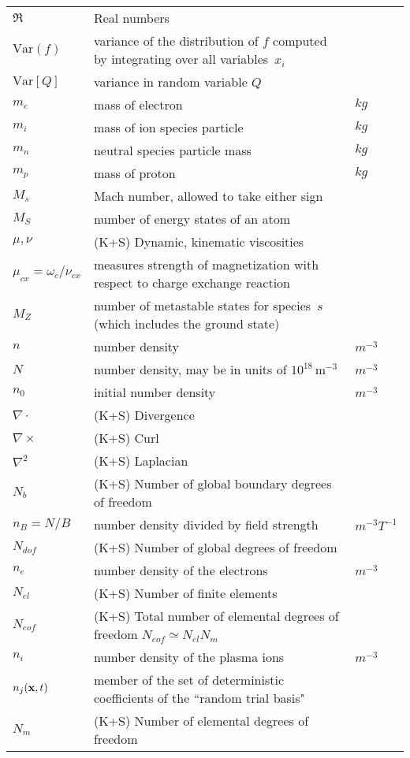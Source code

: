 \begin{longtable}{|p{3.0cm}|p{10.0cm}|p{3.0cm}|}
$\mathfrak{R}$ & Real numbers & \\
$\mathrm{Var}(f)$ & variance of the distribution of $f$ computed by integrating over all variables~$x_i$  & \\
$\mathrm{Var}[Q]$ & variance in random variable $Q$  & \\
$m_e$ & mass of electron & $kg$ \\
$m_i$ & mass of ion species particle & $kg$ \\
$m_n$ & neutral species particle mass & $kg$ \\
$m_p$ & mass of proton & $kg$ \\
$M_s$ & Mach number, allowed to take either sign & \\
$M_S$ & number of energy states of an atom & \\
$\mu, \nu$ &  (K+S) Dynamic, kinematic viscosities & \\
$\mu_{cx}=\omega_c/\nu_{cx}$ & measures strength of magnetization with respect to charge exchange reaction & \\
$M_Z$ & number of metastable states for species~$s$ (which includes the ground state) & \\
$n$ & number density & $m^{-3}$ \\
$N$ & number density, may be in units of $10^{18}$\,m$^{-3}$ & $m^{-3}$ \\
$n_0$ & initial number density & $m^{-3}$ \\
$\nabla \cdot$ &  (K+S) Divergence & \\
$\nabla \times$ &  (K+S) Curl & \\
$\nabla^2$ &  (K+S) Laplacian & \\
$N_{b}$ &  (K+S) Number of global boundary degrees of freedom & \\
$n_B=N/B$ & number density divided by field strength & $m^{-3}T^{-1}$ \\
$N_{dof}$ &  (K+S) Number of global degrees of freedom & \\
$n_e$ & number density of the electrons & $m^{-3}$ \\
$N_{el}$ &  (K+S) Number of finite elements & \\
$N_{eof}$ &  (K+S) Total number of elemental degrees of freedom $N_{eof} \simeq N_{el}N_m$ & \\
$n_i$ & number density of the plasma ions & $m^{-3}$ \\
$n_j({\bf x},t)$ & member of the set of deterministic coefficients of the ``random trial basis" & \\
$N_{m}$ &  (K+S) Number of elemental degrees of freedom & \\

\end{longtable}
